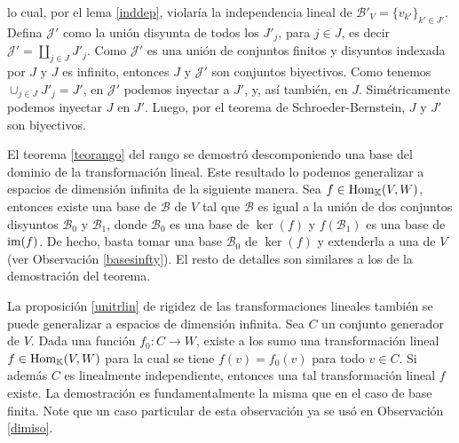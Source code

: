 \begin{obs}
lo cual, por el lema \ref{inddep}, violar\'ia la independencia lineal de $\mathcal{B}'_V=\{v_{k'}\}_{k'\in J'}$. Defina $\mathcal{J}'$ como la uni\'on disyunta de todos los $J'_j$, para $j\in J$, es decir $\mathcal{J}'=\coprod_{j\in J} J'_j$.
Como $\mathcal{J}'$ es una uni\'on de conjuntos finitos y disyuntos indexada por $J$ y $J$ es infinito, entonces $J$ y $\mathcal{J}'$ son conjuntos biyectivos. Como tenemos $\cup_{j\in J}J'_j=J'$, en $\mathcal{J}'$ podemos inyectar a $J'$, y, as\'i tambi\'en, en $J$. Sim\'etricamente podemos inyectar $J$ en $J'$. Luego, por el teorema de Schroeder-Bernstein, $J$ y $J'$ son biyectivos.
\end{obs}

\begin{obs}
El teorema \ref{teorango} del rango se demostr\'o descomponiendo una base del dominio de la transformaci\'on lineal. Este resultado lo podemos generalizar a espacios de dimensi\'on infinita de la siguiente manera. Sea $f\in\operatorname{Hom}_{\mathbb{K}}(V,W)$, entonces existe una base de $\mathcal{B}$ de $V$ tal que $\mathcal{B}$ es igual a la unión de dos conjuntos disyuntos $\mathcal{B}_0$ y $ \mathcal{B}_1$, donde $\mathcal{B}_0$ es una base de $\ker(f)$ y $f\left(\mathcal{B}_1\right)$ es una base de $\operatorname{im}(f)$. De hecho, basta tomar una base $\mathcal{B}_0$ de $\ker(f)$ y extenderla a una de $V$ (ver Observaci\'on \ref{basesinfty}). El resto de detalles son similares a los de la demostraci\'on del teorema.
\end{obs}

\begin{obs}\label{unitrlinealinfty}
La proposici\'on \ref{unitrlin} de rigidez de las transformaciones lineales tambi\'en se puede generalizar a espacios de dimensi\'on infinita. Sea $C$ un conjunto generador de $V$. Dada una funci\'on $f_0: C\rightarrow W$, existe a los sumo una transformaci\'on lineal $f\in\operatorname{Hom}_{\mathbb{K}}(V,W)$ para la cual se tiene $f(v)=f_0(v)$ para todo $v\in C$. Si adem\'as $C$ es linealmente independiente, entonces una tal transformaci\'on lineal $f$ existe. La demostraci\'on es fundamentalmente la misma que en el caso de base finita. Note que un caso particular de esta observaci\'on ya se us\'o en Observaci\'on \ref{dimiso}.
\end{obs}

